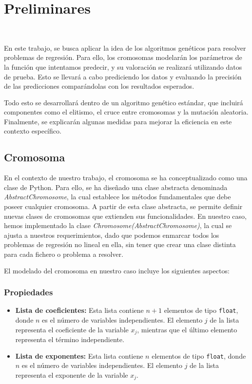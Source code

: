 \documentclass[conference,a4paper]{IEEEtran}
\begin{document}
\section{Preliminares}
~\label{sec: preliminares}

En este trabajo, se busca aplicar la idea de los algoritmos genéticos para resolver problemas de regresión. Para ello, los cromosomas modelarán los parámetros de la función que intentamos predecir, y su valoración se realizará utilizando datos de prueba. Esto se llevará a cabo prediciendo los datos y evaluando la precisión de las predicciones comparándolas con los resultados esperados.

Todo esto se desarrollará dentro de un algoritmo genético estándar, que incluirá componentes como el elitismo, el cruce entre cromosomas y la mutación aleatoria. Finalmente, se explicarán algunas medidas para mejorar la eficiencia en este contexto específico.

\subsection{Cromosoma}

En el contexto de nuestro trabajo, el cromosoma se ha conceptualizado como una clase de Python. Para ello, se ha diseñado una clase abstracta denominada \textit{AbstractChromosome}, la cual establece los métodos fundamentales que debe poseer cualquier cromosoma. A partir de esta clase abstracta, se permite definir nuevas clases de cromosomas que extienden sus funcionalidades. En nuestro caso, hemos implementado la clase \textit{Chromosome(AbstractChromosome)}, la cual se ajusta a nuestros requerimientos, dado que podemos enmarcar todos los problemas de regresión no lineal en ella, sin tener que crear una clase distinta para cada fichero o problema a resolver.

El modelado del cromosoma en nuestro caso incluye los siguientes aspectos:

\subsubsection{Propiedades}
\begin{itemize}
    \item \textbf{Lista de coeficientes:} Esta lista contiene \( n + 1 \) elementos de tipo \texttt{float}, donde \( n \) es el número de variables independientes. El elemento \( j \) de la lista representa el coeficiente de la variable \( x_j \), mientras que el último elemento representa el término independiente.
    \item \textbf{Lista de exponentes:} Esta lista contiene \( n \) elementos de tipo \texttt{float}, donde \( n \) es el número de variables independientes. El elemento \( j \) de la lista representa el exponente de la variable \( x_j \).
\end{itemize}
\end{document}
